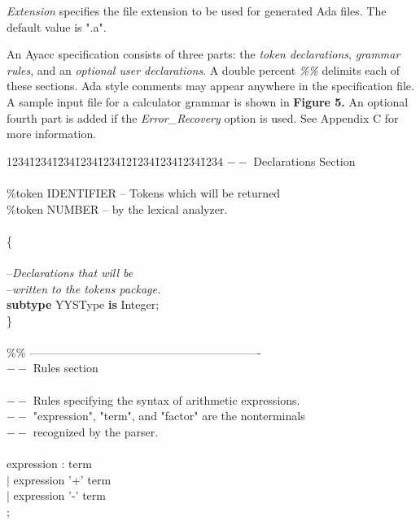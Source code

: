 {\it Extension} specifies the file extension to be used for generated Ada files.
The default value is ".a".

An Ayacc specification  consists of three parts: the
{\it token declarations}, {\it grammar rules}, and an {\it optional user
declarations}.  A double percent
{\it \%\%}
delimits
each of these sections.  Ada style comments may appear
anywhere in the specification file.  A sample input
file for a calculator grammar is shown in {\bf Figure 5.}
An optional fourth part is added if the {\it Error\_Recovery} option
is used.  See Appendix C for more information.
\newpage
\noindent\hspace{-0.05in}\hrulefill\hspace{0.0in}\\
\vspace{-0.2in}
\begin{tabbing}
1234\=1234\=1\=234\=1234\=1234\=12\=1234\=1234\=1234\=1234 \kill
$--$ Declarations Section\\
\\
\%token IDENTIFIER         --  Tokens which will be returned\\
\%token NUMBER             --  by the lexical analyzer.\\
\\
\{\\
\\
\>  --{\it  Declarations that will be}\\
\>  --{\it  written to the tokens package.}\\
\>  {\bf subtype} YYSType {\bf is} Integer;\\
\}\\
\\
\%\% -------------------------------------------------------------\\
$--$ Rules section\\
\\
$--$ Rules specifying the syntax of arithmetic expressions.\\
$--$ "expression", "term", and "factor" are the nonterminals\\
$--$ recognized by the parser.\\
\\
expression : term\\
\>\>\>           $|$ expression '+' term\\
\>\>\>           $|$ expression '-' term\\
\>\>\>           ;\\
\\

\end{tabbing}

